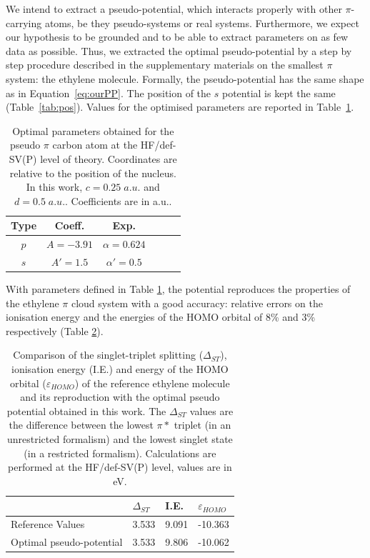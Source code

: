 \documentclass[aip]{revtex4-1}
\begin{document}
We intend to extract a pseudo-potential, which interacts properly with 
other $\pi$-carrying atoms, be they pseudo-systems or real systems.
Furthermore, we expect our hypothesis to be grounded and to be able to
extract parameters on as few data as possible.
Thus, we extracted the optimal pseudo-potential by a step by step procedure described in 
the supplementary materials on the smallest $\pi$ system: the ethylene molecule.
Formally, the pseudo-potential has the same shape as in Equation~\ref{eq:ourPP}.
The position of the $s$ potential is kept the same (Table~\ref{tab:pos}). 
Values for the optimised parameters are reported in Table~\ref{tab:params}.

\begin{table}[ht]
\caption{\label{tab:params}Optimal parameters obtained for the pseudo 
$\pi$ carbon atom at the HF/def-SV(P) level of theory.
Coordinates are relative to the position of the nucleus.
In this work, $c=0.25\;a.u.$ and $d=0.5\;a.u.$.
Coefficients are in a.u..
}
\begin{tabular}{ccccrr}
\hline\hline
Type &  Coeff. & Exp. \\
\hline
$p$  & $A=-3.91$ & $\alpha=0.624$ \\
$s$  & $A'=1.5$   & $\alpha'=0.5$   \\
\hline\hline
\end{tabular}
\end{table}

With parameters defined in Table \ref{tab:params}, the potential reproduces the properties
of the ethylene $\pi$ cloud system with a good accuracy: relative errors on the ionisation
energy and the energies of the HOMO orbital of 8\% and 3\% respectively (Table \ref{tab:res_ourPP}).

\begin{table}[ht]
\caption{\label{tab:res_ourPP}Comparison of the
singlet-triplet splitting ($\Delta_{ST}$), ionisation
energy (I.E.) and energy of the HOMO orbital ($\varepsilon_{HOMO}$)
of the reference ethylene molecule
and its reproduction with the optimal pseudo potential obtained in this work.
The $\Delta_{ST}$ values are the difference
between the lowest $\pi*$ triplet (in an unrestricted formalism) and the lowest singlet state
(in a restricted formalism).
Calculations are performed at the HF/def-SV(P) level, values are in eV.}
\begin{tabular}{llll}
\hline\hline
& $\Delta_{ST}$  & I.E.  & $\varepsilon_{HOMO}$  \\
\hline
Reference Values & 3.533 & 9.091 & -10.363 \\
Optimal pseudo-potential & 3.533 & 9.806 & -10.062 \\
\hline\hline
\end{tabular}
\end{table}
\end{document}
